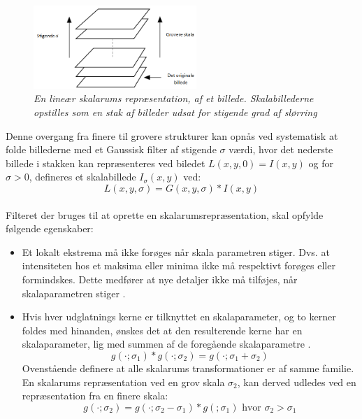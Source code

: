 \begin{figure}[H]
    \centering
    \includegraphics[width=0.55\textwidth]{fig/32.png}
     \vspace{-0.5em}
    \begin{center}    
       \caption{{\footnotesize \textit{En lineær skalarums repræsentation, af et billede. Skalabillederne opstilles som en stak af billeder udsat for stigende grad af slørring}}}
    \label{fig:scalerep}
     \end{center}
     \vspace{-2.5em}
  \end{figure} \noindent
Denne overgang fra finere til grovere strukturer kan opnås ved systematisk at folde billederne med et Gaussisk filter af stigende $\sigma$ værdi, hvor det nederste billede i stakken kan repræsenteres ved biledet $ L(x,y,0) = I(x,y)$ og for $\sigma>0$, defineres et skalabillede $I_\sigma(x,y)$ ved:
\begin{equation}
L(x,y,\sigma) = G(x,y,\sigma)\ast I(x,y)
\label{scalespace1}
\end{equation}
\\
Filteret der bruges til at oprette en skalarumsrepræsentation, skal opfylde følgende egenskaber:
\begin{itemize}
\item{Et lokalt ekstrema må ikke forøges når skala parametren stiger. Dvs. at intensiteten hos et maksima eller minima ikke må respektivt forøges eller formindskes. Dette medfører at nye detaljer ikke må tilføjes, når skalaparametren stiger \cite{lindkth}.}
\item{Hvis hver udglatnings kerne er tilknyttet en skalaparameter, og to kerner foldes med hinanden, ønskes det at den resulterende kerne har en skalaparameter, lig med summen af de foregående skalaparametre \cite{springer}.
\begin{equation}
g(\cdot;\sigma_1) \ast g(\cdot;\sigma_2)=g(\cdot;\sigma_1+\sigma_2)
\label{semi}
\end{equation}
Ovenstående definere at alle skalarums transformationer er af samme familie. En skalarums repræsentation ved en grov skala $\sigma_2$, kan derved udledes ved en repræsentation fra en finere skala:
\begin{equation}
g(\cdot;\sigma_2) = g(\cdot;\sigma_2-\sigma_1)\ast g(;\sigma_1)\text{     hvor     }\sigma_2>\sigma_1
\end{equation}}
\end{itemize}
